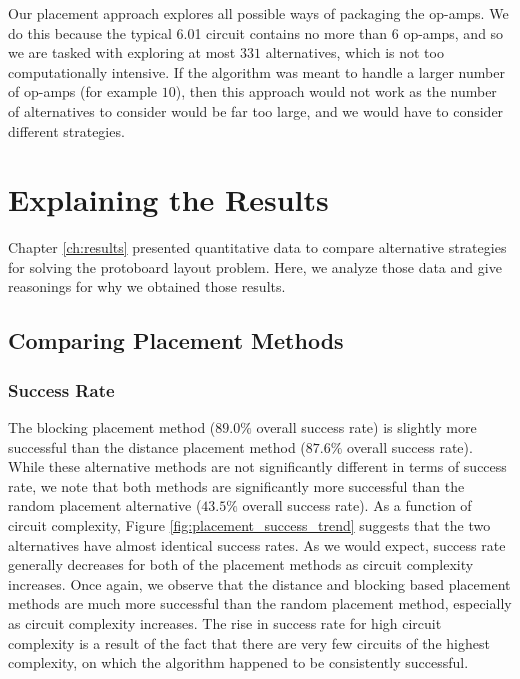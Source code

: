 Our placement approach explores all possible ways
of packaging the op-amps. We do this because the typical 6.01 circuit contains
no more than $6$ op-amps, and so we are tasked with exploring at most $331$
alternatives, which is not too computationally intensive. If the
algorithm was meant to handle a larger number of op-amps (for example $10$), then
this approach would not work as the number of alternatives to consider would be
far too large, and we would have to consider different strategies.

\section{Explaining the Results}

Chapter \ref{ch:results} presented quantitative data to compare alternative
strategies for solving the protoboard layout problem. Here, we
analyze those data and give reasonings for why we obtained those results.

\subsection{Comparing Placement Methods}

\subsubsection{Success Rate}
The blocking placement method ($89.0\%$ overall success rate)
is slightly more successful than the distance placement method ($87.6\%$ overall
success rate). While these alternative methods are not significantly different
in terms of success rate, we note that both methods are significantly
more successful than the random placement alternative ($43.5\%$ overall success
rate).
As a function of circuit
complexity, Figure
\ref{fig:placement_success_trend} suggests that the two alternatives have almost
identical success rates. As we would expect, success rate generally decreases
for both of the placement methods as circuit complexity increases.
Once again, we observe that the distance and blocking based placement methods
are much more successful than the random placement method, especially as
circuit complexity increases.
The rise in success rate for high circuit complexity is a result of the fact
that there are very few circuits of the highest complexity, on which the
algorithm happened to be consistently successful.


